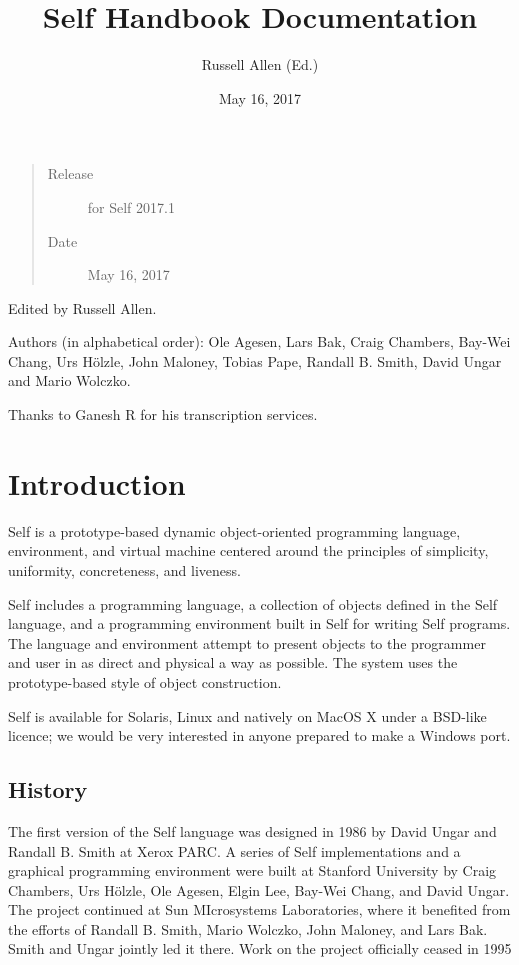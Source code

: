 \documentclass[letterpaper,10pt,english]{sphinxmanual}
\title{Self Handbook Documentation}
\date{May 16, 2017}
\author{Russell Allen (Ed.)}
\begin{document}
\maketitle
\sphinxtableofcontents
{}\label{\detokenize{index::doc}}

\begin{quote}\begin{description}
\item[{Release}] \leavevmode
for Self 2017.1

\item[{Date}] \leavevmode
May 16, 2017

\end{description}\end{quote}

Edited by Russell Allen.

Authors (in alphabetical order): Ole Agesen, Lars Bak, Craig Chambers, Bay-Wei Chang, Urs Hölzle, John Maloney, Tobias Pape, Randall B. Smith, David Ungar and Mario Wolczko.

Thanks to Ganesh R for his transcription services.


\chapter{Introduction}
\label{\detokenize{intro:introduction}}\label{\detokenize{intro::doc}}\label{\detokenize{intro:the-self-handbook}}
Self is a prototype-based dynamic object-oriented programming language, environment, and virtual machine centered around the principles of simplicity, uniformity, concreteness, and liveness.

Self includes a programming language, a collection of objects defined in the Self language, and a programming environment built in Self for writing Self programs. The language and environment attempt to present objects to the programmer and user in as direct and physical a way as possible. The system uses the prototype-based style of object construction.

Self is available for Solaris, Linux and natively on MacOS X under a BSD-like licence; we would be very interested in anyone prepared to make a Windows port.


\section{History}
\label{\detokenize{intro:history}}
The first version of the Self language was designed in 1986 by David Ungar and Randall B. Smith at Xerox PARC. A series of Self implementations and a graphical programming environment were built at Stanford University by Craig Chambers, Urs Hölzle, Ole Agesen, Elgin Lee, Bay-Wei Chang, and David Ungar. The project continued at Sun MIcrosystems Laboratories, where it benefited from the efforts of Randall B. Smith, Mario Wolczko, John Maloney, and Lars Bak. Smith and Ungar jointly led it there. Work on the project officially ceased in 1995
\end{document}
